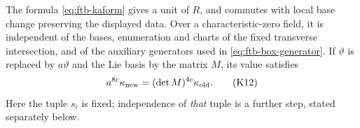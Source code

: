 \begin{srproposition}
\label{prop:ftb-integral-koszul-invariant}
The formula \eqref{eq:ftb-kaform} gives a unit of \(R\), and
commutes with local base change preserving the displayed data.
Over a characteristic-zero field, it is independent of the bases,
enumeration and charts of the fixed transverse intersection, and of
the auxiliary generators used in \eqref{eq:ftb-box-generator}.
If \(\vartheta\) is replaced by \(a\vartheta\) and the Lie basis by
the matrix \(M\), its value satisfies
\[
              a^{8c}\kappa_{\rm new}
                         =(\det M)^{4c}\kappa_{\rm old}.
 \tag{K12}\label{eq:ftb-koszul-homog}
\]
Here the tuple \(s_i\) is fixed; independence of \emph{that} tuple
is a further step, stated separately below.
\end{srproposition}
